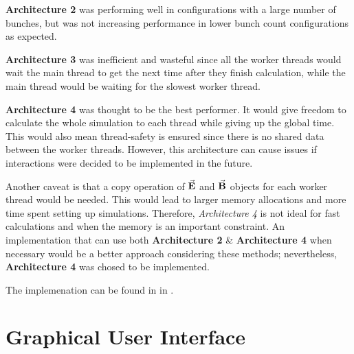 \documentclass[a4paper,oneside,12pt]{report}
\numberwithin{equation}{chapter}
\begin{document}
\textbf{Architecture 2} was performing well in configurations with a large number of bunches, but was not increasing performance in lower bunch count configurations as expected.

\textbf{Architecture 3} was inefficient and wasteful since all the worker threads would wait the main thread to get the next time after they finish calculation, while the main thread would be waiting for the slowest worker thread.

\textbf{Architecture 4} was thought to be the best performer. It would give freedom to calculate the whole simulation to each thread while giving up the global time.
This would also mean thread-safety is ensured since there is no shared data between the worker threads. 
However, this architecture can cause issues if \ee interactions were decided to be implemented in the future.

Another caveat is that a copy operation of $\vec{\textbf{E}}$ and $\vec{\textbf{B}}$ objects for each worker thread would be needed.
This would lead to larger memory allocations and more time spent setting up simulations. 
Therefore, \textit{Architecture 4} is not ideal for fast calculations and when the memory is an important constraint.
An implementation that can use both \textbf{Architecture 2} \& \textbf{Architecture 4} when necessary would be a better approach considering these methods;
nevertheless, \textbf{Architecture 4} was chosed to be implemented.

The implemenation can be found in  in .



\newpage


\section{Graphical User Interface}
\end{document}

